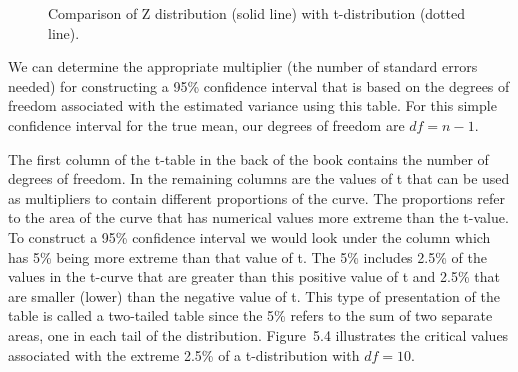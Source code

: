 \documentclass[12pt]{article}
\begin{document}
\newpage


\begin{figure}[ht]
\centering
{}
\caption{Comparison of Z distribution (solid line) with t-distribution (dotted line).}
\label{fig:5.3}
\end{figure}

We can determine the appropriate multiplier (the number of standard errors needed) for constructing a 95\% confidence interval that is based on the degrees of freedom associated with the estimated variance using this table. For this simple confidence interval for the true mean, our degrees of freedom are $df = n - 1$.

The first column of the t-table in the back of the book contains the number of degrees of freedom. In the remaining columns are the values of t that can be used as multipliers to contain different proportions of the curve. The proportions refer to the area of the curve that has numerical values more extreme than the t-value. To construct a 95\% confidence interval we would look under the column which has 5\% being more extreme than that value of t. The 5\% includes 2.5\% of the values in the t-curve that are greater than this positive value of t and 2.5\% that are smaller (lower) than the negative value of t. This type of presentation of the table is called a two-tailed table since the 5\% refers to the sum of two separate areas, one in each tail of the distribution. Figure~5.4 illustrates the critical values associated with the extreme 2.5\% of a t-distribution with $df = 10$.
\end{document}
